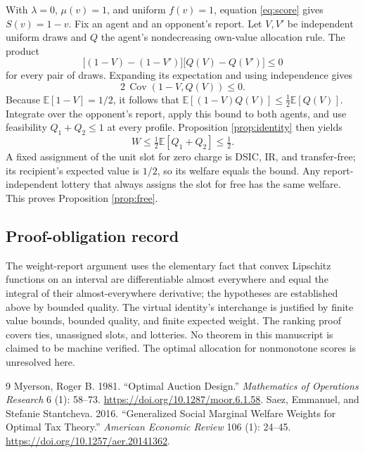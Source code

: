 \documentclass[11pt]{article}
\newcommand{\E}{\mathbb E}
\begin{document}
With $\lambda=0$, $\mu(v)=1$, and uniform $f(v)=1$, equation \eqref{eq:score} gives $S(v)=1-v$. Fix an agent and an opponent's report. Let $V,V'$ be independent uniform draws and $Q$ the agent's nondecreasing own-value allocation rule. The product
\[
\bigl[(1-V)-(1-V')\bigr]\bigl[Q(V)-Q(V')\bigr]\le0
\]
for every pair of draws. Expanding its expectation and using independence gives
\[
2\,\operatorname{Cov}(1-V,Q(V))\le0.
\]
Because $\E[1-V]=1/2$, it follows that $\E[(1-V)Q(V)]\le\tfrac12\E[Q(V)]$. Integrate over the opponent's report, apply this bound to both agents, and use feasibility $Q_1+Q_2\le1$ at every profile. Proposition \ref{prop:identity} then yields
\[
W\le\tfrac12\E[Q_1+Q_2]\le\tfrac12.
\]
A fixed assignment of the unit slot for zero charge is DSIC, IR, and transfer-free; its recipient's expected value is $1/2$, so its welfare equals the bound. Any report-independent lottery that always assigns the slot for free has the same welfare. This proves Proposition \ref{prop:free}.

\clearpage
\subsection{Proof-obligation record}

The weight-report argument uses the elementary fact that convex Lipschitz functions on an interval are differentiable almost everywhere and equal the integral of their almost-everywhere derivative; the hypotheses are established above by bounded quality. The virtual identity's interchange is justified by finite value bounds, bounded quality, and finite expected weight. The ranking proof covers ties, unassigned slots, and lotteries. No theorem in this manuscript is claimed to be machine verified. The optimal allocation for nonmonotone scores is unresolved here.

\begin{thebibliography}{9}
Myerson, Roger B. 1981. ``Optimal Auction Design.'' \emph{Mathematics of Operations Research} 6 (1): 58--73. \url{https://doi.org/10.1287/moor.6.1.58}.
Saez, Emmanuel, and Stefanie Stantcheva. 2016. ``Generalized Social Marginal Welfare Weights for Optimal Tax Theory.'' \emph{American Economic Review} 106 (1): 24--45. \url{https://doi.org/10.1257/aer.20141362}.
\end{thebibliography}
\end{document}
